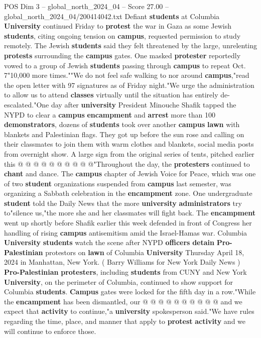 \begin{textsample}{POS Dim 3 – global\_north\_2024\_04 – Score 27.00 – global\_north\_2024\_04/200414042.txt}  \label{ex:f3_pos_075}
Defiant \textbf{students} at Columbia \textbf{University} continued Friday to \textbf{protest} the war in Gaza as some Jewish \textbf{students}, citing ongoing tension on \textbf{campus}, requested permission to study remotely.
The Jewish \textbf{students} said they felt threatened by the large, unrelenting \textbf{protests} surrounding the \textbf{campus} gates.
One masked \textbf{protester} reportedly vowed to a group of Jewish \textbf{students} passing through \textbf{campus} to repeat Oct. 7"10,000 more times.""We do not feel safe walking to nor around \textbf{campus},"read the open letter with 97 signatures as of Friday night."We urge the administration to allow us to attend \textbf{classes} virtually until the situation has entirely de-escalated."One day after \textbf{university} President Minouche Shafik tapped the NYPD to clear a \textbf{campus} \textbf{encampment} and \textbf{arrest} more than 100 \textbf{demonstrators}, dozens of \textbf{students} took over another \textbf{campus} \textbf{lawn} with blankets and Palestinian flags.
They got up before the sun rose and calling on their classmates to join them with warm clothes and blankets, social media posts from overnight show.
A large sign from the original series of tents, pitched earlier this @ @ @ @ @ @ @ @ @ @"Throughout the day, the \textbf{protesters} continued to \textbf{chant} and dance.
The \textbf{campus} chapter of Jewish Voice for Peace, which was one of two \textbf{student} organizations suspended from \textbf{campus} last semester, was organizing a Sabbath celebration in the \textbf{encampment} zone.
One undergraduate \textbf{student} told the Daily News that the more \textbf{university} \textbf{administrators} try to"silence us,"the more she and her classmates will fight back.
The \textbf{encampment} went up shortly before Shafik earlier this week defended in front of Congress her handling of rising \textbf{campus} antisemitism amid the Israel-Hamas war.
Columbia \textbf{University} \textbf{students} watch the scene after NYPD \textbf{officers} \textbf{detain} \textbf{Pro-Palestinian} protestors on \textbf{lawn} of Columbia \textbf{University} Thursday April 18, 2024 in Manhattan, New York. ( Barry Williams for New York Daily News ) \textbf{Pro-Palestinian} \textbf{protesters}, including \textbf{students} from CUNY and New York \textbf{University}, on the perimeter of Columbia, continued to show support for Columbia \textbf{students}. \textbf{Campus} gates were locked for the fifth day in a row."While the \textbf{encampment} has been dismantled, our @ @ @ @ @ @ @ @ @ @ and we expect that \textbf{activity} to continue,"a \textbf{university} spokesperson said."We have rules regarding the time, place, and manner that apply to \textbf{protest} \textbf{activity} and we will continue to enforce those.

\end{textsample}
